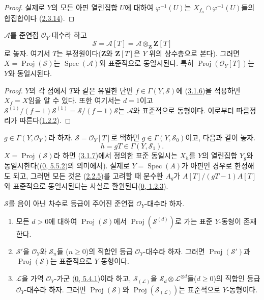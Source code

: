 \begin{proof}
실제로 $Y$의 모든 아핀 열린집합 $U$에 대하여 $\varphi^{-1}(U)$는
$X_{f_\alpha}\cap\varphi^{-1}(U)$들의 합집합이다
(\hyperref[II.2.3.14-ko]{2.3.14}).
\end{proof}

\begin{corollary}[3.1.7]
\label{II.3.1.7-ko}
$\mathcal{A}$를 준연접 $\mathcal{O}_Y$-대수라 하고
\[
  \mathcal{S}=\mathcal{A}[T]
  =\mathcal{A}\otimes_{\mathbf{Z}}\mathbf{Z}[T]
\]
로 놓자. 여기서 $T$는 부정원이다($\mathbf{Z}$와 $\mathbf{Z}[T]$은
$Y$ 위의 상수층으로 본다). 그러면
$X=\operatorname{Proj}(\mathcal{S})$는
$\operatorname{Spec}(\mathcal{A})$와 표준적으로 동일시된다. 특히
$\operatorname{Proj}(\mathcal{O}_Y[T])$는 $Y$와 동일시된다.
\end{corollary}

\begin{proof}
$Y$의 각 점에서 $T$와 같은 유일한 단면
$f\in\Gamma(Y,\mathcal{S})$에 (\hyperref[II.3.1.6-ko]{3.1.6})을 적용하면
$X_f=X$임을 알 수 있다. 또한 여기서는 $d=1$이고
$\mathcal{S}^{(1)}/(f-1)\mathcal{S}^{(1)}
=\mathcal{S}/(f-1)\mathcal{S}$는 $\mathcal{A}$와 표준적으로 동형이다.
이로부터 따름정리가 따른다(\hyperref[II.1.2.2-ko]{1.2.2}).
\end{proof}

$g\in\Gamma(Y,\mathcal{O}_Y)$라 하자. $\mathcal{S}=\mathcal{O}_Y[T]$로
택하면 $g\in\Gamma(Y,\mathcal{S}_0)$이고, 다음과 같이 놓자.
\[
  h=gT\in\Gamma(Y,\mathcal{S}_1).
\]
$X=\operatorname{Proj}(\mathcal{S})$라 하면
(\hyperref[II.3.1.7-ko]{3.1.7})에서 정의한 표준 동일시는 $X_h$를 $Y$의
열린집합 $Y_g$와 동일시한다((\hyperref[0.5.5.2-ko]{0, 5.5.2})의
의미에서). 실제로 $Y=\operatorname{Spec}(A)$가 아핀인 경우로 한정해도
되고, 그러면 모든 것은 (\hyperref[II.2.2.5-ko]{2.2.5})를 고려할 때
분수환 $A_g$가 $A[T]/(gT-1)A[T]$와 표준적으로 동일시된다는 사실로
환원된다(\hyperref[0.1.2.3-ko]{0, 1.2.3}).

\begin{proposition}[3.1.8]
\label{II.3.1.8-ko}
$\mathcal{S}$를 음이 아닌 차수로 등급이 주어진 준연접
$\mathcal{O}_Y$-대수라 하자.
\begin{enumerate}
  \item[\rm(i)] 모든 $d>0$에 대하여 $\operatorname{Proj}(\mathcal{S})$에서
    $\operatorname{Proj}(\mathcal{S}^{(d)})$로 가는 표준 $Y$-동형이
    존재한다.


  \item[\rm(ii)] $\mathcal{S}'$을 $\mathcal{O}_Y$와 $\mathcal{S}_n$들
    ($n\geq0$)의 직합인 등급 $\mathcal{O}_Y$-대수라 하자. 그러면
    $\operatorname{Proj}(\mathcal{S}')$과
    $\operatorname{Proj}(\mathcal{S})$는 표준적으로 $Y$-동형이다.
  \item[\rm(iii)] $\mathcal{L}$을 가역 $\mathcal{O}_Y$-가군
    (\hyperref[0.5.4.1-ko]{0, 5.4.1})이라 하고,
    $\mathcal{S}_{(\mathcal{L})}$을
    $\mathcal{S}_d\otimes\mathcal{L}^{\otimes d}$들($d\geq0$)의 직합인
    등급 $\mathcal{O}_Y$-대수라 하자. 그러면
    $\operatorname{Proj}(\mathcal{S})$와
    $\operatorname{Proj}(\mathcal{S}_{(\mathcal{L})})$는 표준적으로
    $Y$-동형이다.
\end{enumerate}
\end{proposition}

